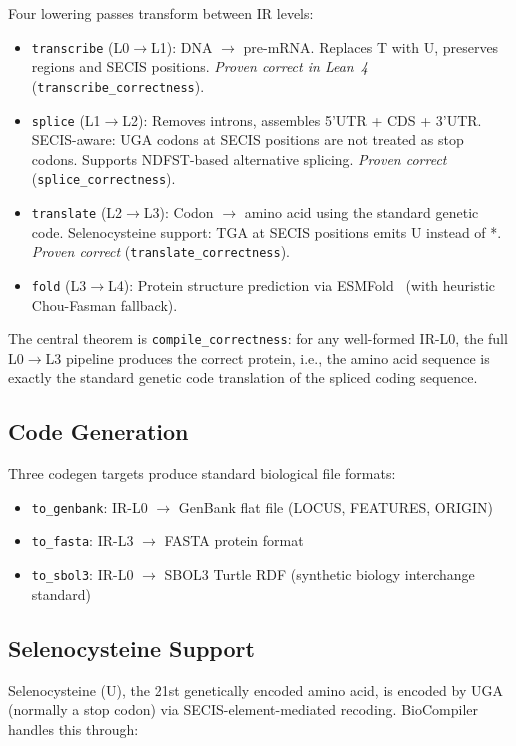 \documentclass[11pt,a4paper]{article}
\theoremstyle{definition}
\begin{document}
Four lowering passes transform between IR levels:

\begin{itemize}[leftmargin=*,itemsep=1pt]
\item \texttt{transcribe} (L0$\to$L1): DNA $\to$ pre-mRNA. Replaces T with U, preserves regions and SECIS positions. \textit{Proven correct in Lean~4} (\texttt{transcribe\_correctness}).
\item \texttt{splice} (L1$\to$L2): Removes introns, assembles 5'UTR + CDS + 3'UTR. SECIS-aware: UGA codons at SECIS positions are not treated as stop codons. Supports NDFST-based alternative splicing. \textit{Proven correct} (\texttt{splice\_correctness}).
\item \texttt{translate} (L2$\to$L3): Codon $\to$ amino acid using the standard genetic code. Selenocysteine support: TGA at SECIS positions emits U instead of *. \textit{Proven correct} (\texttt{translate\_correctness}).
\item \texttt{fold} (L3$\to$L4): Protein structure prediction via ESMFold~\cite{lin2023esm} (with heuristic Chou-Fasman fallback).
\end{itemize}

The central theorem is \texttt{compile\_correctness}: for any well-formed IR-L0, the full L0$\to$L3 pipeline produces the correct protein, i.e., the amino acid sequence is exactly the standard genetic code translation of the spliced coding sequence.

\subsection{Code Generation}

Three codegen targets produce standard biological file formats:
\begin{itemize}[leftmargin=*,itemsep=1pt]
\item \texttt{to\_genbank}: IR-L0 $\to$ GenBank flat file (LOCUS, FEATURES, ORIGIN)
\item \texttt{to\_fasta}: IR-L3 $\to$ FASTA protein format
\item \texttt{to\_sbol3}: IR-L0 $\to$ SBOL3 Turtle RDF (synthetic biology interchange standard)
\end{itemize}

\subsection{Selenocysteine Support}

Selenocysteine (U), the 21st genetically encoded amino acid, is encoded by UGA (normally a stop codon) via SECIS-element-mediated recoding. BioCompiler handles this through:
\end{document}
